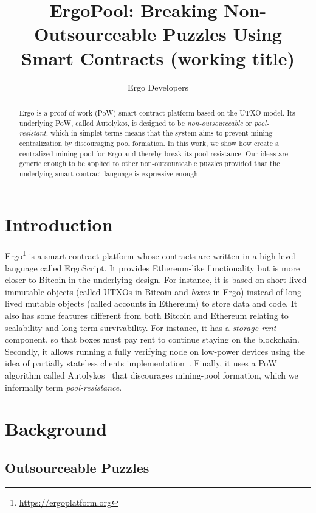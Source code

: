 \documentclass[11pt]{article}
\newcommand{\authnote}[2]{\marginpar{\parbox{\marginparwidth}{\tiny %
  \textsf{#1 {\textcolor{blue}{notes: #2}}}}}%
  \textcolor{blue}{\textbf{\dag}}}
\newcommand{\authnote}[2]{
  \textsf{#1 \textcolor{blue}{: #2}}}
\newcommand{\authnote}[2]{}
\newcommand{\snote}[1]{{\authnote{\textcolor{yellow}{Scalahub notes}}{#1}}}
\newcommand{\langname}{ErgoScript\xspace}
\newcommand{\powname}{Autolykos\xspace}
\newcommand{\poolname}{ErgoPool\xspace}
\begin{document}
\title{\poolname: Breaking Non-Outsourceable Puzzles Using Smart Contracts (working title)}
\author{Ergo Developers}
\maketitle

\begin{abstract}
	Ergo is a proof-of-work (PoW) smart contract platform based on the UTXO model. Its underlying PoW, called \powname, is designed to be {\em non-outsourceable} or {\em pool-resistant}, which in simplet terms means that the system aims to prevent mining centralization by discouraging pool formation. 
	In this work, we show how create a centralized mining pool for Ergo and thereby break its pool resistance. Our ideas are generic enough to be applied to other non-outsourseable puzzles provided that the underlying smart contract language is expressive enough. 
	
\end{abstract}

\section{Introduction}
\snote{Below text copied from PoW intro paper}

Ergo\footnote{\url{https://ergoplatform.org}} is a smart contract platform whose contracts are written in a high-level language called \langname. It provides Ethereum-like functionality but is more closer to Bitcoin in the underlying design. For instance, it is based on short-lived immutable objects (called UTXOs in Bitcoin and {\em boxes} in Ergo) instead of long-lived mutable objects (called accounts in Ethereum) to store data and code. It also has some features different from both Bitcoin and Ethereum relating to scalability and long-term survivability. For instance, it has a {\em storage-rent} component, so that boxes must pay rent to continue staying on the blockchain. Secondly, it allows running a fully verifying node on low-power devices using the idea of partially stateless clients implementation~\cite{RMCI17}. Finally, it uses a PoW algorithm called \powname~\cite{autolykos} that discourages mining-pool formation, which we informally term {\em pool-resistance}. 

\section{Background}
\subsection{Outsourceable Puzzles}
\end{document}
